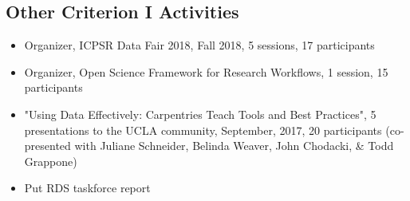 \subsection{Other Criterion I Activities}
\begin{itemize}[label={}]
  \item Organizer, ICPSR Data Fair 2018, Fall 2018, 5 sessions, 17 participants
  \item Organizer, Open Science Framework for Research Workflows, 1 session,	15 participants
  \item "Using Data Effectively: Carpentries Teach Tools and Best Practices", 5 presentations to the UCLA community, September, 2017,	20 participants (co-presented with Juliane Schneider, Belinda Weaver, John Chodacki, \& Todd Grappone)
  \item Put RDS taskforce report
\end{itemize}
